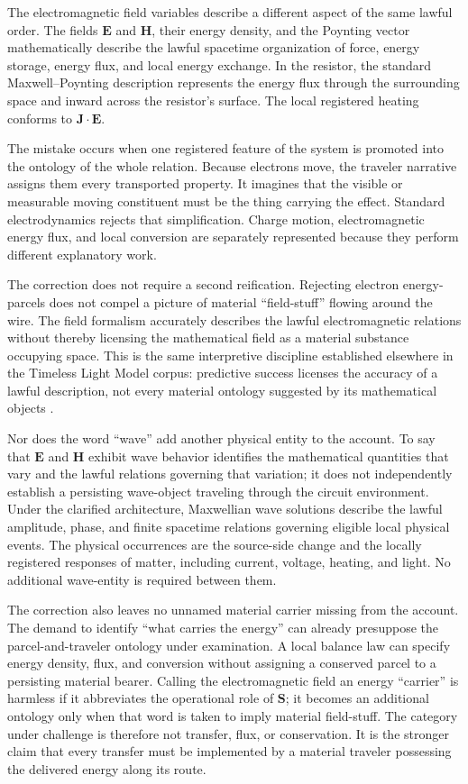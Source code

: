 \documentclass[12pt,onecolumn]{article}
\begin{document}
The electromagnetic field variables describe a different aspect of the same lawful order. The fields $\mathbf E$ and $\mathbf H$, their energy density, and the Poynting vector mathematically describe the lawful spacetime organization of force, energy storage, energy flux, and local energy exchange. In the resistor, the standard Maxwell--Poynting description represents the energy flux through the surrounding space and inward across the resistor's surface. The local registered heating conforms to $\mathbf J\cdot\mathbf E$.

The mistake occurs when one registered feature of the system is promoted into the ontology of the whole relation. Because electrons move, the traveler narrative assigns them every transported property. It imagines that the visible or measurable moving constituent must be the thing carrying the effect. Standard electrodynamics rejects that simplification. Charge motion, electromagnetic energy flux, and local conversion are separately represented because they perform different explanatory work.

The correction does not require a second reification. Rejecting electron energy-parcels does not compel a picture of material ``field-stuff'' flowing around the wire. The field formalism accurately describes the lawful electromagnetic relations without thereby licensing the mathematical field as a material substance occupying space. This is the same interpretive discipline established elsewhere in the Timeless Light Model corpus: predictive success licenses the accuracy of a lawful description, not every material ontology suggested by its mathematical objects \cite{fermion,unified}.

Nor does the word ``wave'' add another physical entity to the account. To say that $\mathbf E$ and $\mathbf H$ exhibit wave behavior identifies the mathematical quantities that vary and the lawful relations governing that variation; it does not independently establish a persisting wave-object traveling through the circuit environment. Under the clarified architecture, Maxwellian wave solutions describe the lawful amplitude, phase, and finite spacetime relations governing eligible local physical events. The physical occurrences are the source-side change and the locally registered responses of matter, including current, voltage, heating, and light. No additional wave-entity is required between them.

The correction also leaves no unnamed material carrier missing from the account. The demand to identify ``what carries the energy'' can already presuppose the parcel-and-traveler ontology under examination. A local balance law can specify energy density, flux, and conversion without assigning a conserved parcel to a persisting material bearer. Calling the electromagnetic field an energy ``carrier'' is harmless if it abbreviates the operational role of $\mathbf S$; it becomes an additional ontology only when that word is taken to imply material field-stuff. The category under challenge is therefore not transfer, flux, or conservation. It is the stronger claim that every transfer must be implemented by a material traveler possessing the delivered energy along its route.
\end{document}
